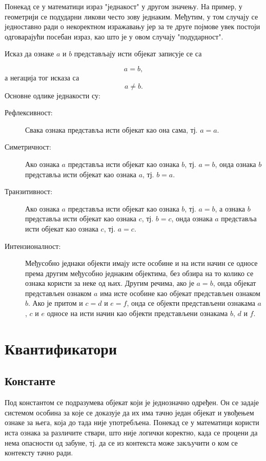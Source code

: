 \documentclass[a4paper]{book}
\newcommand{\tj}{\mbox{тј.} }
\begin{document}
Понекад се у математици израз "једнакост" у другом значењу. На пример, у геометрији се подударни ликови
често зову једнаким. Међутим, у том случају се једноставно ради о некоректном изражавању јер за те друге
појмове увек постоји одговарајући посебан израз, као што је у овом случају "подударност".

Исказ да ознаке $a$ и $b$ представљају исти објекат записује се са

$$
a=b,
$$
а негација тог исказа са
$$
a\neq b.
$$
Основне одлике једнакости су:
\begin{description}
\item[Рефлексивност:]
Свака ознака представља исти објекат као она сама, \tj $a=a$.
\item[Симетричност:]
Ако ознака $a$ представља исти објекат као ознака $b$, \tj $a=b$, онда ознака $b$ представља исти објекат као ознака $a$, \tj $b=a$.
\item[Транзитивност:]
Ако ознака $a$ представља исти објекат као ознака $b$, \tj $a=b$, а ознака $b$ представља исти објекат као ознака $c$, \tj $b=c$,
онда ознака $a$ представља исти објекат као ознака $c$, \tj $a=c$.
\item[Интензионалност:]
Међусобно једнаки објекти имају исте особине и на исти начин се односе према другим међусобно једнаким објектима, без обзира
на то колико се ознака користи за неке од њих. Другим речима, ако је $a=b$, онда објекат представљен ознаком $a$ има исте особине
као објекат представљен ознаком $b$. Ако је притом и $c=d$ и $e=f$, онда се објекти представљени ознакама $a$, $c$ и $e$
односе на исти начин као објекти представљени ознакама $b$, $d$ и $f$.
\end{description}

\section{Квантификатори}

\subsection{Константе}

\indent

Под константом се подразумева објекат који је једнозначно одређен. Он се задаје си\-сте\-мом особина за које се доказује
да их има тачно један објекат и увођењем ознаке за њега, која до тада није употребљена. Понекад се у математици користи
иста ознака за различите ствари, што није логички коректно, када се процени да нема опасности од забуне, \tj
да се из контекста може закључити о ком се контексту тачно ради.
\end{document}
